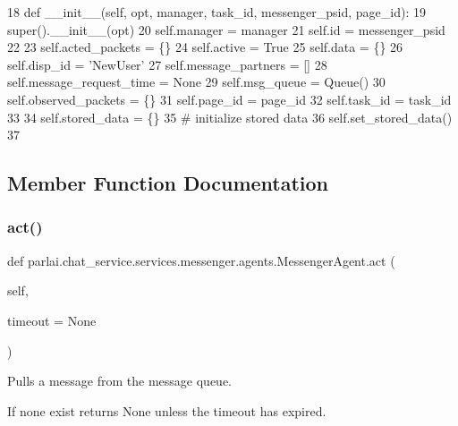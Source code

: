 \begin{DoxyCode}
18     \textcolor{keyword}{def }\_\_init\_\_(self, opt, manager, task\_id, messenger\_psid, page\_id):
19         super().\_\_init\_\_(opt)
20         self.manager = manager
21         self.id = messenger\_psid
22 
23         self.acted\_packets = \{\}
24         self.active = \textcolor{keyword}{True}
25         self.data = \{\}
26         self.disp\_id = \textcolor{stringliteral}{'NewUser'}
27         self.message\_partners = []
28         self.message\_request\_time = \textcolor{keywordtype}{None}
29         self.msg\_queue = Queue()
30         self.observed\_packets = \{\}
31         self.page\_id = page\_id
32         self.task\_id = task\_id
33 
34         self.stored\_data = \{\}
35         \textcolor{comment}{# initialize stored data}
36         self.set\_stored\_data()
37 
\end{DoxyCode}


\subsection{Member Function Documentation}
\mbox{\label{classparlai_1_1chat__service_1_1services_1_1messenger_1_1agents_1_1MessengerAgent_a50484a75fb326cade0cb5c2b8a0614ac}} 
\subsubsection{\texorpdfstring{act()}{act()}}
{\footnotesize\ttfamily def parlai.\+chat\+\_\+service.\+services.\+messenger.\+agents.\+Messenger\+Agent.\+act (\begin{DoxyParamCaption}\item[{}]{self,  }\item[{}]{timeout = {\ttfamily None} }\end{DoxyParamCaption})}

\begin{DoxyVerb}Pulls a message from the message queue.

If none exist returns None unless the timeout has expired.
\end{DoxyVerb}
 

